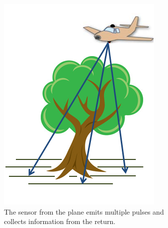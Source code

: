 \documentclass{subfiles}
\begin{document}
\begin{figure} [h!]

\begin{subfigure}[t]{.31\textwidth}
	\centering
	\includegraphics[width=.9\textwidth]{img/VoxelisationA}
	\caption{The sensor from the plane emits multiple pulses and collects information from the return.}
	\label{fig:VoxelisationA_scan}
\end{subfigure} \hfill
\begin{subfigure}[t]{.31\textwidth}
	\centering

\end{subfigure}
\end{figure}
\end{document}

